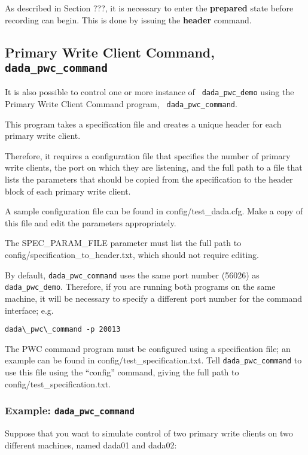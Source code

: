 As described in Section ???, it is necessary to enter the 
{\bf prepared} state before recording can begin.  This is done by issuing
the {\bf header} command.

\subsection{Primary Write Client Command, {\tt dada\_pwc\_command}}

It is also possible to control one or more instance of {\tt
dada\_pwc\_demo} using the Primary Write Client Command program, {\tt
dada\_pwc\_command}. 

This program takes a specification file and creates a unique header
for each primary write client.

Therefore, it requires a configuration file that specifies the number
of primary write clients, the port on which they are listening, and
the full path to a file that lists the parameters that should be
copied from the specification to the header block of each primary
write client.

A sample configuration file can be found in config/test\_dada.cfg.
Make a copy of this file and edit the parameters appropriately.

The SPEC\_PARAM\_FILE parameter must list the full path to
config/specification\_to\_header.txt, which should not require editing.

By default, {\tt dada\_pwc\_command} uses the same port number (56026)
as {\tt dada\_pwc\_demo}.  Therefore, if you are running both programs
on the same machine, it will be necessary to specify a different port
number for the command interface; e.g.
\begin{verbatim}
dada\_pwc\_command -p 20013
\end{verbatim}

The PWC command program must be configured using a specification file;
an example can be found in config/test\_specification.txt.  Tell
{\tt dada\_pwc\_command} to use this file using the ``config'' command,
giving the full path to config/test\_specification.txt.

\subsubsection{Example: {\tt dada\_pwc\_command}}

Suppose that you want to simulate control of two primary write clients
on two different machines, named dada01 and dada02:

